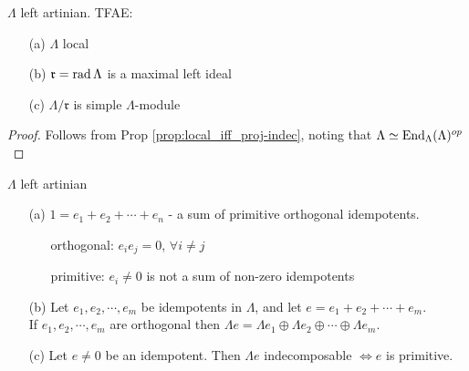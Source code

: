 \begin{cor}
$\Lambda$ left artinian. TFAE:
\begin{enumerate}
\item[(a)] $\Lambda$ local
\item[(b)] $\mathfrak{r} = \operatorname{rad}\nolimits \Lambda$ is a maximal left ideal
\item[(c)] $\Lambda/\mathfrak{r}$ is simple $\Lambda$-module
\end{enumerate}
\begin{proof}
Follows from Prop \ref{prop:local_iff_proj-indec}, noting that $\Lambda \simeq \operatorname{End}_\Lambda(\Lambda)^{op}$
\end{proof}
\end{cor}

\begin{prop}
$\Lambda$ left artinian
\begin{enumerate}
\item[(a)] $1 = e_1 +e_2 + \cdots + e_n$ - a sum of primitive orthogonal idempotents.
\begin{enumerate}
\item[orthogonal:] $e_ie_j = 0$, $\forall i \neq j$
\item[primitive:] $e_i \neq 0$ is not a sum of non-zero idempotents
\end{enumerate}

\item[(b)] Let $e_1, e_2, \cdots, e_m$ be idempotents in $\Lambda$, and let $e = e_1 + e_2 + \cdots + e_m$.\\
If $e_1, e_2, \cdots, e_m$ are orthogonal then $\Lambda e = \Lambda e_1 \oplus \Lambda e_2 \oplus \cdots \oplus \Lambda e_m$.

\item[(c)] Let $e\neq 0$ be an idempotent. Then $\Lambda e$ indecomposable $\iff e$ is primitive.
\end{enumerate}



\end{prop}
